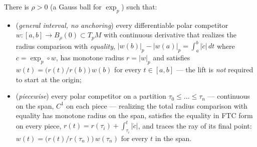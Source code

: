 \begin{lemma}
  \label{lem:dc-ch3-3-6-equality-ray-piecewise}


  There is $\rho>0$ (a Gauss ball for $\exp_p$) such that:
  \begin{itemize}
  \item (\emph{general interval, no anchoring}) every differentiable polar
    competitor $w:[a,b]\to B_\rho(0)\subset T_pM$ with continuous derivative
    that realizes the radius comparison with \emph{equality},
    $|w(b)|_p-|w(a)|_p=\int_a^b|\dot c|\,dt$ where $c=\exp_p\circ w$, has
    monotone radius $r=|w|_p$ and satisfies
    $w(t)=\bigl(r(t)/r(b)\bigr)\,w(b)$ for every $t\in[a,b]$ — the lift is
    \emph{not} required to start at the origin;
  \item (\emph{piecewise}) every polar competitor on a partition
    $\tau_0\le\dots\le\tau_n$ — continuous on the span, $C^1$ on each piece —
    realizing the total radius comparison with equality has monotone radius
    on the span, satisfies the equality in FTC form on every piece,
    $r(t)=r(\tau_i)+\int_{\tau_i}^t|\dot c|$, and traces the ray of its
    final point: $w(t)=\bigl(r(t)/r(\tau_n)\bigr)\,w(\tau_n)$ for every $t$
    in the span.
  \end{itemize}
\end{lemma}
